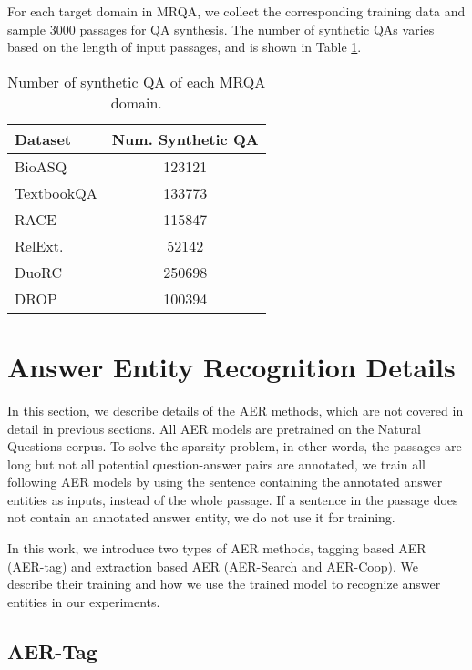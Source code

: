 \documentclass[11pt,a4paper]{article}
\begin{document}
For each target domain in MRQA, we collect the corresponding training data and sample 3000 passages for QA synthesis. The number of synthetic QAs varies based on the length of input passages, and is shown in Table \ref{tab:mrqa-num}.

\begin{table}[]
\centering
\begin{tabular}{@{}lc@{}}
\toprule
\textbf{Dataset} & \multicolumn{1}{l}{\textbf{Num. Synthetic QA}} \\ \midrule
BioASQ           & 123121                                         \\
TextbookQA       & 133773                                         \\
RACE             & 115847                                         \\
RelExt.          & 52142                                          \\
DuoRC            & 250698                                         \\
DROP             & 100394                                         \\ \bottomrule
\end{tabular}
\caption{Number of synthetic QA of each MRQA domain.}
\label{tab:mrqa-num}
\end{table}

\section{Answer Entity Recognition Details}
\label{sec:aer}
In this section, we describe details of the AER methods, which are not covered in detail in previous sections. All AER models are pretrained on the Natural Questions corpus. To solve the sparsity problem, in other words, the passages are long but not all potential question-answer pairs are annotated, we train all following AER models by using the sentence containing the annotated answer entities as inputs, instead of the whole passage. If a sentence in the passage does not contain an annotated answer entity, we do not use it for training.

In this work, we introduce two types of AER methods, tagging based AER (AER-tag) and extraction based AER (AER-Search and AER-Coop). We describe their training and how we use the trained model to recognize answer entities in our experiments.

\subsection{AER-Tag}
\end{document}
